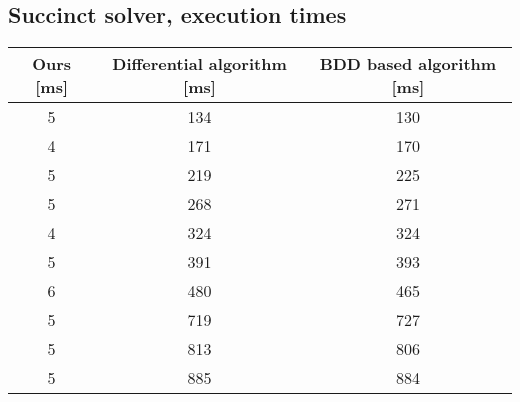 \subsection{Succinct solver, execution times}
\begin{center}
	\begin{tabular}{ | c | c | c | }
		\hline
		Ours [ms] & Differential algorithm [ms] & BDD based algorithm [ms] \\
		\hline
		\hline
		5 & 134 & 130 \\
		4 & 171 & 170 \\
		5 & 219 & 225 \\
		5 & 268 & 271 \\
		4 & 324 & 324 \\
		5 & 391 & 393 \\
		6 & 480 & 465 \\
		5 & 719 & 727 \\
		5 & 813 & 806 \\
		5 & 885 & 884 \\
		\hline
	\end{tabular}
\end{center}